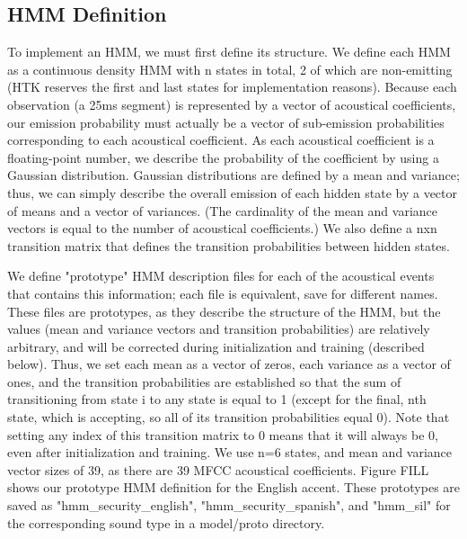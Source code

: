 \documentclass{wileySev}
\begin{document}
\subsection{HMM Definition}
To implement an HMM, we must first define its structure. We define each HMM as a continuous density HMM with n states in total, 2 of which are non-emitting (HTK reserves the first and last states for implementation reasons). Because each observation (a 25ms segment) is represented by a vector of acoustical coefficients, our emission probability must actually be a vector of sub-emission probabilities corresponding to each acoustical coefficient. As each acoustical coefficient is a floating-point number, we describe the probability of the coefficient by using a Gaussian distribution. Gaussian distributions are defined by a mean and variance; thus, we can simply describe the overall emission of each hidden state by a vector of means and a vector of variances. (The cardinality of the mean and variance vectors is equal to the number of acoustical coefficients.) We also define a nxn transition matrix that defines the transition probabilities between hidden states. 

We define "prototype" HMM description files for each of the acoustical events that contains this information; each file is equivalent, save for different names. These files are prototypes, as they describe the structure of the HMM, but the values (mean and variance vectors and transition probabilities) are relatively arbitrary, and will be corrected during initialization and training (described below). Thus, we set each mean as a vector of zeros, each variance as a vector of ones, and the transition probabilities are established so that the sum of transitioning from state i to any state is equal to 1 (except for the final, nth state, which is accepting, so all of its transition probabilities equal 0). Note that setting any index of this transition matrix to 0 means that it will always be 0, even after initialization and training. We use n=6 states, and mean and variance vector sizes of 39, as there are 39 MFCC acoustical coefficients.
Figure FILL shows our prototype HMM definition for the English accent. These prototypes are saved as "hmm\_security\_english", "hmm\_security\_spanish", and "hmm\_sil" for the corresponding sound type in a model/proto directory.
\end{document}
